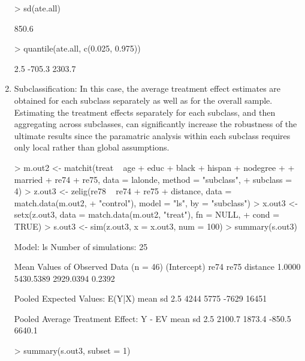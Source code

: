 \begin{enumerate}
\begin{Schunk}
\begin{Soutput}
\end{Soutput}
\begin{Sinput}
> sd(ate.all)
\end{Sinput}
\begin{Soutput}
[1] 850.6

\end{Soutput}
\begin{Sinput}
> quantile(ate.all, c(0.025, 0.975))
\end{Sinput}
\begin{Soutput}
  2.5%  97.5% 
-705.3 2303.7 

\end{Soutput}
\end{Schunk}
  
\item Subclassification: In this case, the average treatment effect
  estimates are obtained for each subclass separately as well as
  for the overall sample.  Estimating the treatment effects separately 
  for each subclass, and then aggregating across subclasses, can significantly
  increase the robustness of the ultimate results since the paramatric analysis
  within each subclass requires only local rather than global assumptions.

\begin{Schunk}
\begin{Sinput}
> m.out2 <- matchit(treat ~ age + educ + black + hispan + nodegree + 
+     married + re74 + re75, data = lalonde, method = "subclass", 
+     subclass = 4)
> z.out3 <- zelig(re78 ~ re74 + re75 + distance, data = match.data(m.out2, 
+     "control"), model = "ls", by = "subclass")
> x.out3 <- setx(z.out3, data = match.data(m.out2, "treat"), fn = NULL, 
+     cond = TRUE)
> s.out3 <- sim(z.out3, x = x.out3, num = 100)
> summary(s.out3)
\end{Sinput}
\begin{Soutput}

  Model: ls 
  Number of simulations: 25 

Mean Values of Observed Data (n = 46) 
(Intercept)        re74        re75    distance 
     1.0000   5430.5389   2929.0394      0.2392 

Pooled Expected Values: E(Y|X)
 mean    sd  2.5% 97.5% 
 4244  5775 -7629 16451 

Pooled Average Treatment Effect: Y - EV
  mean     sd   2.5%  97.5% 
2100.7 1873.4 -850.5 6640.1 

\end{Soutput}
\begin{Sinput}
> summary(s.out3, subset = 1)
\end{Sinput}
\begin{Soutput}


\end{Soutput}
\end{Schunk}
\end{enumerate}
